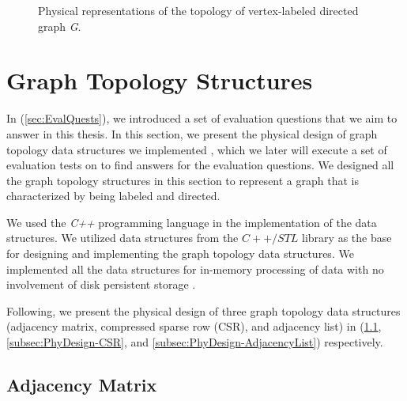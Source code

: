 {\begin{figure}[H]
{        \label{fig:CSR_phy}
    }
\centering
    \caption{Physical representations of the topology of vertex-labeled directed graph \textit{G}.}
    \label{fig:GraphTopology_physical}
\end{figure}


\section{Graph Topology Structures}
\label{sec:PhyDesign-GraphTopology}

In (\ref{sec:EvalQuests}), we introduced a set of evaluation questions that we aim to answer in this thesis. In this section, we present the physical design of graph topology data structures we implemented , which we later will execute a set of evaluation tests on to find answers for the evaluation questions. We designed all the graph topology structures in this section to represent a graph that is characterized by being labeled and directed.

We used the \textit{C++} programming language in the implementation of the data structures. We utilized data structures from the $C++/STL$ library as the base for designing and implementing the graph topology data structures. We implemented all the data structures for in-memory processing of data with no involvement of disk persistent storage \cite{josuttis2012c++}.

Following, we present the physical design of three graph topology data structures (adjacency matrix, compressed sparse row (CSR), and adjacency list) in (\ref{subsec:PhyDesign-AdjacencyMatrix}, \ref{subsec:PhyDesign-CSR}, and \ref{subsec:PhyDesign-AdjacencyList}) respectively.



\subsection{Adjacency Matrix}
\label{subsec:PhyDesign-AdjacencyMatrix}

}
